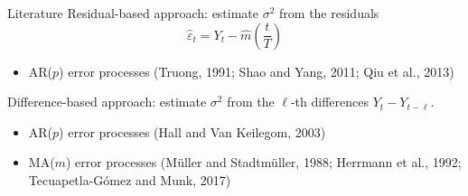 \documentclass[10pt, handout]{beamer}
\begin{document}
\begin{frame}{Literature}
	Residual-based approach: estimate $\sigma^2$ from the residuals $$\widehat{\varepsilon}_t = Y_t - \widehat{m}\left(\frac{t}{T}\right)$$
	\vskip -2mm
	\begin{itemize}
		\item AR($p$) error processes (Truong, 1991; Shao and Yang, 2011; Qiu et al., 2013)
	\end{itemize}\pause
	Difference-based approach: estimate $\sigma^2$ from the $\ell$-th differences $Y_t - Y_{t-\ell}$.
	\begin{itemize}
		\item AR($p$) error processes (Hall and Van Keilegom, 2003) 
		\item MA($m$) error processes (M{\"u}ller and Stadtm{\"u}ller, 1988; Herrmann et al., 1992; Tecuapetla-G{\'o}mez and Munk, 2017)
	\end{itemize}
\end{frame}



%
\end{document}
